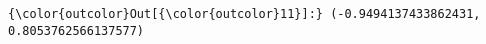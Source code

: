 \documentclass[11pt]{article}
\begin{document}
\begin{Verbatim}[commandchars=\\\{\}]
{\color{outcolor}Out[{\color{outcolor}11}]:} (-0.9494137433862431, 0.8053762566137577)
\end{Verbatim}
            
    \begin{center}
    \end{center}
    { \hspace*{\fill} \\}
    

    
    
    
    
\end{document}
